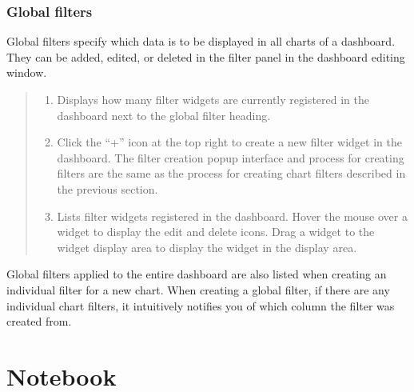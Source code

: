 \documentclass[letterpaper,10pt,english]{sphinxmanual}
\begin{document}
\subsection{Global filters}
\label{\detokenize{discovery/part04/global_filter:id1}}\label{\detokenize{discovery/part04/global_filter::doc}}
Global filters specify which data is to be displayed in all charts of a dashboard. They can be added, edited, or deleted in the filter panel in the dashboard editing window.
\begin{quote}

\begin{figure}[H]
\centering

\noindent{}
\end{figure}
\begin{enumerate}
\def\theenumi{\arabic{enumi}}
\def\labelenumi{\theenumi .}
\makeatletter\def\p@enumii{\p@enumi \theenumi .}\makeatother
\item {} 
 Displays how many filter widgets are currently registered in the dashboard next to the global filter heading.

\item {} 
 Click the “+” icon at the top right to create a new filter widget in the dashboard. The filter creation popup interface and process for creating filters are the same as the process for creating chart filters described in the previous section.

\item {} 
 Lists filter widgets registered in the dashboard. Hover the mouse over a widget to display the edit and delete icons. Drag a widget to the widget display area to display the widget in the display area.

\end{enumerate}
\end{quote}

Global filters applied to the entire dashboard are also listed when creating an individual filter for a new chart. When creating a global filter, if there are any individual chart filters, it intuitively notifies you of which column the filter was created from.


\chapter{Notebook}
\label{\detokenize{discovery/part05/index:id1}}\label{\detokenize{discovery/part05/index::doc}}
\begin{figure}[H]
\centering

\noindent{}
\end{figure}
\end{document}
